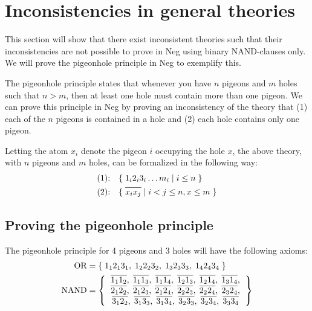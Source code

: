 
\section{Inconsistencies in general theories}
\label{sec:Inconsistencies in general theories}
This section will show that there exist inconsistent theories such that their inconsistencies are not possible to prove in Neg using binary NAND-clauses only.
We will prove the pigeonhole principle in Neg to exemplify this.

The pigeonhole principle states that whenever you have $n$ pigeons and $m$ holes such that $n > m$, then at least one hole must contain more than one pigeon.
We can prove this principle in Neg by proving an inconsistency of the theory that (1) each of the $n$ pigeons is contained in a hole and (2) each hole contains only one pigeon.

Letting the atom $x_i$ denote the pigeon $i$ occupying the hole $x$, the above theory, with $n$ pigeons and $m$ holes, can be formalized in the following way:
\begin{align}
  \text{(1):}\quad &\{ \; 1_i2_i3_i\dots m_i \;|\; i \leq n \; \}\\
  \text{(2):}\quad &\{ \; \ol{x_ix_j} \;|\; i < j \leq n, x \leq m \; \}
\end{align}
\subsection{Proving the pigeonhole principle}
\label{sub:Proving the pigeonhole principle}
The pigeonhole principle for 4 pigeons and 3 holes will have the following axioms:
\begin{align}
  \begin{split}
    \text{OR} &= \{ \; 1_12_13_1,\; 1_22_23_2,\; 1_32_33_3,\; 1_42_43_4 \; \}\\
    \text{NAND} &= \left \{
    \begin{tabular}{c}
      $\ol{1_11_2},\;\ol{1_11_3},\;\ol{1_11_4},\;\ol{1_21_3},\;\ol{1_21_4},\;\ol{1_31_4},$\\
      $\ol{2_12_2},\;\ol{2_12_3},\;\ol{2_12_4},\;\ol{2_22_3},\;\ol{2_22_4},\;\ol{2_32_4},$\\
      $\ol{3_12_2},\;\ol{3_13_3},\;\ol{3_13_4},\;\ol{3_23_3},\;\ol{3_23_4},\;\ol{3_33_4}$
    \end{tabular}
    \right \}
  \end{split}
  \label{eq:ax_pigeon}
\end{align}

